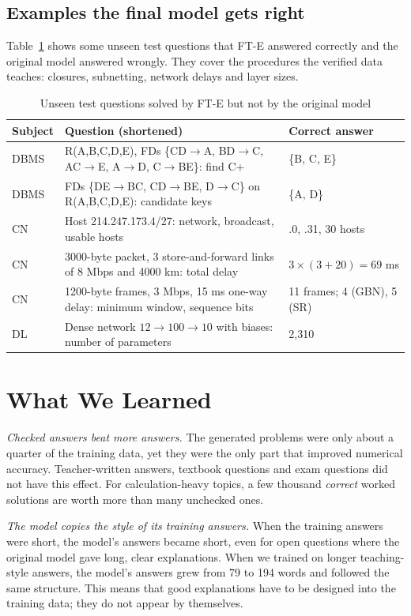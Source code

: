 \documentclass[conference]{IEEEtran}
\newcommand{\ra}{$\rightarrow$}
\begin{document}
\subsection{Examples the final model gets right}
Table~\ref{tab:examples} shows some unseen test questions that FT-E answered correctly and the original model answered wrongly. They cover the procedures the verified data teaches: closures, subnetting, network delays and layer sizes.

\begin{table}[t]
\centering
\caption{Unseen test questions solved by FT-E but not by the original model}
\label{tab:examples}
\begin{tabular}{@{}l p{3.9cm} p{1.7cm}@{}}
\toprule
Subject & Question (shortened) & Correct answer \\
\midrule
DBMS & R(A,B,C,D,E), FDs \{CD\ra A, BD\ra C, AC\ra E, A\ra D, C\ra BE\}: find C+ & \{B, C, E\} \\
DBMS & FDs \{DE\ra BC, CD\ra BE, D\ra C\} on R(A,B,C,D,E): candidate keys & \{A, D\} \\
CN & Host 214.247.173.4/27: network, broadcast, usable hosts & .0, .31, 30 hosts \\
CN & 3000-byte packet, 3 store-and-forward links of 8 Mbps and 4000 km: total delay & $3\times(3+20)=69$ ms \\
CN & 1200-byte frames, 3 Mbps, 15 ms one-way delay: minimum window, sequence bits & 11 frames; 4 (GBN), 5 (SR) \\
DL & Dense network $12\rightarrow100\rightarrow10$ with biases: number of parameters & 2,310 \\
\bottomrule
\end{tabular}
\end{table}

\section{What We Learned}
\emph{Checked answers beat more answers.} The generated problems were only about a quarter of the training data, yet they were the only part that improved numerical accuracy. Teacher-written answers, textbook questions and exam questions did not have this effect. For calculation-heavy topics, a few thousand \emph{correct} worked solutions are worth more than many unchecked ones.

\emph{The model copies the style of its training answers.} When the training answers were short, the model's answers became short, even for open questions where the original model gave long, clear explanations. When we trained on longer teaching-style answers, the model's answers grew from 79 to 194 words and followed the same structure. This means that good explanations have to be designed into the training data; they do not appear by themselves.
\end{document}
